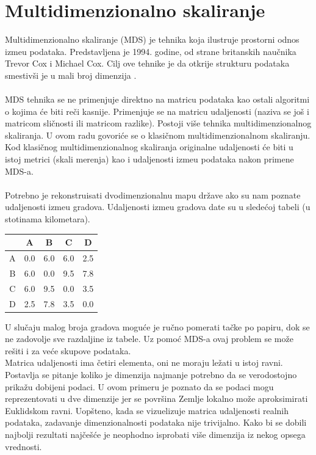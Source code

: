 \chapter{Multidimenzionalno skaliranje}
Multidimenzionalno skaliranje (\textenglish{MDS}) je tehnika koja ilustruje prostorni odnos izme\dj u podataka. Predstavljena je 1994. godine, od strane britanskih nau\v cnika \textenglish{Trevor Cox} i \textenglish{Michael Cox}. Cilj ove tehnike je da otkrije strukturu podataka smestiv\v si je u mali broj dimenzija \cite{kratkoOSVakomAlg, mdsUvod, mdsUvod2}.
\\
\\
\textenglish{MDS} tehnika se ne primenjuje direktno na matricu podataka kao ostali algoritmi o kojima \' ce biti re\v ci kasnije. Primenjuje se na matricu udaljenosti (naziva se jo\v s i matricom sli\v cnosti ili matricom razlike). Postoji vi\v se tehnika multidimenzionalnog skaliranja. U ovom radu govori\' ce se o klasi\v cnom multidimenzionalnom skaliranju. Kod klasi\v cnog multidimenzionalnog skaliranja originalne udaljenosti \' ce biti u
istoj metrici (skali merenja) kao i udaljenosti izme\dj u podataka nakon primene \textenglish{MDS-a}. \cite{mds}\\
\\
\npr Potrebno je rekonstruisati dvodimenzionalnu mapu dr\v zave ako su nam poznate udaljenosti izme\dj u gradova. Udaljenosti izme\dj u gradova date su u slede\' coj tabeli (u stotinama kilometara).

\begin{english}
\begin{center}
\begin{tabular}{|c c c c c|} 
 \hline
 & A & B & C & D \\  
 \hline\hline
 A & 0.0 & 6.0 & 6.0 & 2.5 \\ 
 \hline
 B & 6.0 & 0.0 & 9.5 & 7.8 \\
 \hline
 C & 6.0 & 9.5 & 0.0 & 3.5 \\
 \hline
 D & 2.5 & 7.8 & 3.5 & 0.0 \\
 \hline
\end{tabular}
\end{center}
\end{english}

U slu\v caju malog broja gradova mogu\' ce je ru\v cno pomerati ta\v cke po papiru, dok se ne zadovolje sve razdaljine iz tabele. Uz pomo\' c \textenglish{MDS}-a ovaj problem se mo\v ze re\v siti i za ve\' ce skupove podataka. \\
Matrica udaljenosti ima \v cetiri elementa, oni ne moraju le\v zati u istoj ravni. Postavlja se pitanje koliko  je dimenzija najmanje potrebno da se verodostojno prika\v zu dobijeni podaci. U ovom primeru je poznato da se podaci mogu reprezentovati u dve dimenzije jer se povr\v sina Zemlje lokalno mo\v ze aproksimirati  Euklidskom ravni. Uop\v steno, kada se vizuelizuje matrica udaljenosti realnih podataka, zadavanje dimenzionalnosti podataka nije trivijalno.  Kako bi se dobili najbolji rezultati naj\v ce\v s\' ce je neophodno isprobati vi\v se dimenzija iz nekog opsega vrednosti.



